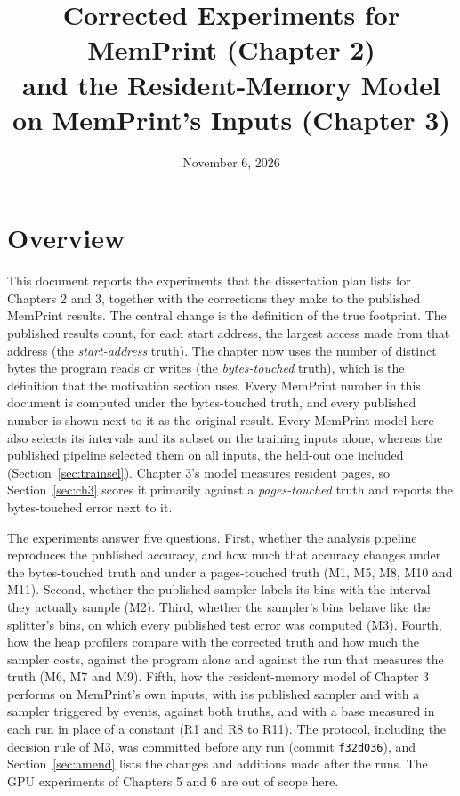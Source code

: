 \documentclass[11pt]{article}
\title{Corrected Experiments for MemPrint (Chapter 2)\\and the Resident-Memory Model on MemPrint's Inputs (Chapter 3)}
\author{}
\date{November 6, 2026}
\newcommand{\memprint}{MemPrint}
\begin{document}
\maketitle

\section{Overview}
\label{sec:overview}

This document reports the experiments that the dissertation plan lists for Chapters 2 and 3, together with the
corrections they make to the published \memprint{} results. The central change is the definition of the true
footprint. The published results count, for each start address, the largest access made from that address
(the \emph{start-address} truth). The chapter now uses the number of distinct bytes the program reads or writes
(the \emph{bytes-touched} truth), which is the definition that the motivation section uses. Every
\memprint{} number in this document is computed under the bytes-touched truth, and every published number is
shown next to it as the original result. Every \memprint{} model here also selects its intervals and its subset on
the training inputs alone, whereas the published pipeline selected them on all inputs, the held-out one included
(Section~\ref{sec:trainsel}). Chapter 3's model measures resident pages, so Section~\ref{sec:ch3}
scores it primarily against a \emph{pages-touched} truth and reports the bytes-touched error next to it.

The experiments answer five questions. First, whether the analysis pipeline reproduces the published accuracy,
and how much that accuracy changes under the bytes-touched truth and under a pages-touched truth (M1, M5, M8, M10
and M11). Second, whether the published
sampler labels its bins with the interval they actually sample (M2). Third, whether the sampler's bins behave
like the splitter's bins, on which every published test error was computed (M3). Fourth, how the heap profilers
compare with the corrected truth and how much the sampler costs, against the program alone and against the run
that measures the truth (M6, M7 and M9). Fifth, how the resident-memory model of Chapter 3 performs on
\memprint{}'s own inputs, with its published sampler and with a sampler triggered by events, against both truths, and with a base measured in each run in place of a constant (R1 and R8 to R11). The protocol, including the decision rule of M3, was committed before any run (commit
\texttt{f32d036}), and Section~\ref{sec:amend} lists the changes and additions made after the runs. The GPU experiments of Chapters 5 and 6 are out of scope here.
\end{document}
